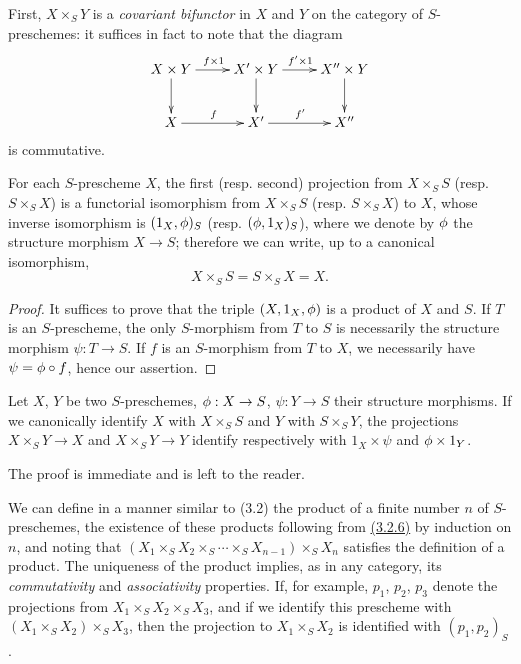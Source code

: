 \begin{env}[3.3.2]
\label{env-1.3.3.2}
First, $X\times_S Y$ is a {\it covariant bifunctor} in $X$ and $Y$ on the
category of $S$-preschemes: it suffices in fact to note that the diagram
\[
  \xymatrix{
    X\times Y\ar[r]^{f\times 1}\ar[d] &
    X'\times Y\ar[r]^{f'\times 1}\ar[d] &
    X''\times Y\ar[d]\\
    X\ar[r]^f &
    X'\ar[r]^{f'} &
    X''
  }
\]
is commutative.
\end{env}

\begin{prop}[3.3.3]
\label{prop-1.3.3.3}
For each $S$-prescheme $X$, the first (resp. second) projection from
$X\times_S S$ (resp. $S\times_S X$) is a functorial isomorphism from
$X\times_S S$ (resp. $S\times_S X$) to $X$, whose inverse isomorphism is
$(1_X,\phi)_S$ (resp. $(\phi,1_X)_S$), where we denote by $\phi$ the
structure morphism $X\to S$; therefore we can write, up to a canonical
isomorphism,
\[
  X\times_S S=S\times_S X=X.
\]
\end{prop}

\begin{proof}
\label{proof-prop-1.3.3.3}
It suffices to prove that the triple $(X,1_X,\phi)$ is a product of $X$ and
$S$. If $T$ is an $S$-prescheme, the only $S$-morphism from $T$ to $S$ is
necessarily the structure morphism $\psi:T\to S$. If $f$ is an $S$-morphism from
$T$ to $X$, we necessarily have $\psi=\phi\circ f$, hence our assertion.
\end{proof}

\begin{cor}[3.3.4]
\label{cor-1.3.3.4}
Let $X$, $Y$ be two $S$-preschemes, $\phi:X\to S$, $\psi:Y\to S$ their
structure morphisms. If we canonically identify $X$ with $X\times_S S$ and $Y$
with $S\times_S Y$, the projections $X\times_S Y\to X$ and $X\times_S Y\to Y$
identify respectively with $1_X\times\psi$ and $\phi\times 1_Y$.
\end{cor}

The proof is immediate and is left to the reader.

\begin{env}[3.3.5]
\label{env-1.3.3.5}
We can define in a manner similar to (3.2) the product of a
finite number $n$ of $S$-preschemes, the existence of these products following
from \hyperref[thm-1.3.2.6]{(3.2.6)} by induction on $n$, and noting that
$(X_1\times_S X_2\times_S\cdots\times_S X_{n-1})\times_S X_n$ satisfies the
definition of a product. The uniqueness of the product implies, as in any
category, its {\it commutativity} and {\it associativity} properties. If, for
example, $p_1$, $p_2$, $p_3$ denote the projections from
$X_1\times_S X_2\times_S X_3$, and if we identify this prescheme with
$(X_1\times_S X_2)\times_S X_3$, then the projection to $X_1\times_S X_2$ is
identified with $(p_1,p_2)_S$.
\end{env}

